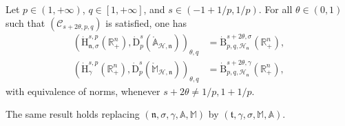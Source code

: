 \documentclass[AHL,Unicode,longabstracts,published]{cedram}
\newcommand{\bbA}{\mathbb{A}}
\newcommand{\bbR}{\mathbb{R}}
\newcommand{\bbM}{\mathbb{M}}
\newcommand{\rmH}{\mathrm{H}}%
\newcommand{\rmB}{\mathrm{B}}
\newcommand{\rmD}{\mathrm{D}}
\newcommand{\clH}{\mathcal{H}}
\newcommand{\clC}{\mathcal{C}}
\newcommand{\fkn}{\mathfrak{n}}
\newcommand{\fkt}{\mathfrak{t}}
\begin{document}
\begin{prop}\label{prop:InterpHomDomainHodgeMaxwellStokes}
Let $p\in(1,+\infty)$, $q\in[1,+\infty]$, and $s\in(-1+1/p,1/p)$. For all $\theta\in(0,1)$ such that $(\clC_{s+2\theta,p,q})$ is satisfied, one has
\begin{align}
\left(\dot{\rmH}^{s,p}_{{\fkn},\sigma}\left(\bbR^n_+\right),\dot{\rmD}^{s}_{p}\left(\mathring{\bbA}_{\clH,\fkn}\right)\right)_{\theta,q} &= \dot{\rmB}^{s+2\theta,\sigma}_{p,q,\clH_{\fkn}}\left(\bbR^n_+\right),\label{eq:1stInterpolSolenoidal}
\\
\left(\dot{\rmH}^{s,p}_{\gamma}\left(\bbR^n_+\right),\dot{\rmD}^{s}_{p}\left(\mathring{\bbM}_{\clH,\fkn}\right)\right)_{\theta,q} &= \dot{\rmB}^{s+2\theta,\gamma}_{p,q,\clH_{\fkn}}\left(\bbR^n_+\right),\label{eq:2ndInterpolSolenoidal}
\end{align}
with equivalence of norms, whenever $s+2\theta\neq 1/p,1+1/p$.

The same result holds replacing $(\fkn,\sigma,\gamma,\bbA,\bbM)$ by $(\fkt,\gamma,\sigma,\bbM,\bbA)$.
\end{prop}
\end{document}
